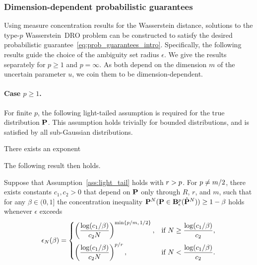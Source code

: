 \subsubsection{Dimension-dependent probabilistic guarantees}
\label{sec:gua_dependent}
Using measure concentration results for the Wasserstein distance, solutions to the type-$p$ Wasserstein~\gls{DRO} problem can be constructed to satisfy the desired probabilistic guarantee~\eqref{eq:prob_guarantees_intro}. 
Specifically, the following results guide the choice of the ambiguity set radius $\epsilon$. We give the results separately for $p \geq 1$ and $p=\infty$. As both depend on the dimension $m$ of the uncertain parameter $u$, we coin them to be dimension-dependent. 


\paragraph{Case $p \geq 1$.} For finite $p$, the following light-tailed assumption is required for the true distribution ${\mathbf P}$. This assumption holds trivially for bounded distributions, and is satisfied by all sub-Gaussian distributions. 

\begin{assumption}
\label{ass:light_tail}
    There exists an exponent 
\end{assumption} 
The following result then holds.
\begin{theorem}
\label{thm:measure_gen}
Suppose that Assumption~\ref{ass:light_tail} holds with $r > p$. For $p \neq m/2$, there exists constants $c_1, c_2 > 0$ that depend on ${\mathbf P}$ only through $R$, $r$, and $m$, such that for any $\beta \in (0,1]$ the concentration inequality ${\mathbf P}^N({\mathbf P} \in \mathbf{B}_{\epsilon}^{p}(\hat{{\mathbf P}}^N)) \geq 1 - \beta$ holds whenever $\epsilon$ exceeds
\begin{equation}
\label{eq:eps_N_finite_p}
	\epsilon_N(\beta) =
	\begin{cases}
		\left(\dfrac{\log(c_1/\beta)}{c_2 N}\right)^{\min\{p/m,\, 1/2\}}, & \text{if } N \geq \dfrac{\log(c_1/\beta)}{c_2}, \\[10pt]
		\left(\dfrac{\log(c_1/\beta)}{c_2 N}\right)^{p/r}, & \text{if } N < \dfrac{\log(c_1/\beta)}{c_2}.
	\end{cases}
\end{equation}
\end{theorem}

